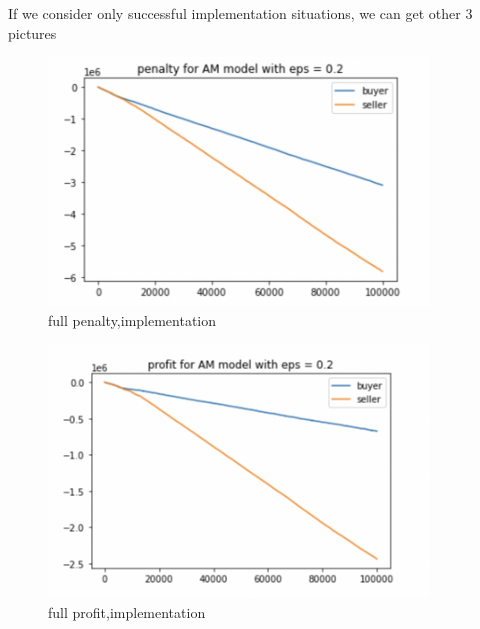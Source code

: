 \documentclass[11pt]{article}
\begin{document}
If we consider only successful implementation situations, we can get other 3 pictures

\begin{figure}[H]
	\begin{center}
	\includegraphics[width=0.9\textwidth]{52.PNG}
	\end{center}
	\caption{full penalty,implementation}
	\label{FIG.52}
\end{figure}

\begin{figure}[H]
	\begin{center}
	\includegraphics[width=0.9\textwidth]{53.PNG}
	\end{center}
	\caption{full profit,implementation}
	\label{FIG.53}
\end{figure}
\end{document}
